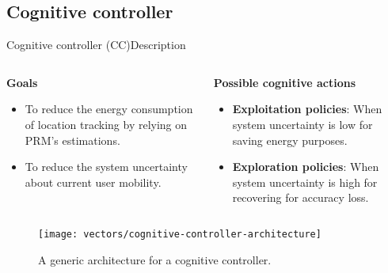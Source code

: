 \subsection{Cognitive controller}
\begin{frame}{Cognitive controller (CC)}{Description}
\small
\vspace{-0.5cm}
\begin{columns}
\begin{column}[T]{0.5\textwidth}
\begin{block}{\small \textbf{Goals}}
  \begin{itemize}
      \item To reduce the energy consumption of location tracking by relying on PRM's estimations.
      \item To reduce the system uncertainty about current user mobility.
  \end{itemize}
\end{block}
\end{column}

\begin{column}[T]{0.5\textwidth}
\begin{block}{\small \textbf{Possible cognitive actions}}
  \begin{itemize}
    \item \textbf{Exploitation policies}: When system uncertainty is low for saving energy purposes.
    \item \textbf{Exploration policies}: When system uncertainty is high for recovering for accuracy loss.
  \end{itemize}
\end{block}
\end{column}
\end{columns}

\begin{figure}
  \centering
  \texttt{[image: vectors/cognitive-controller-architecture]}
  \caption{A generic architecture for a cognitive controller.}
\end{figure}

\end{frame}

